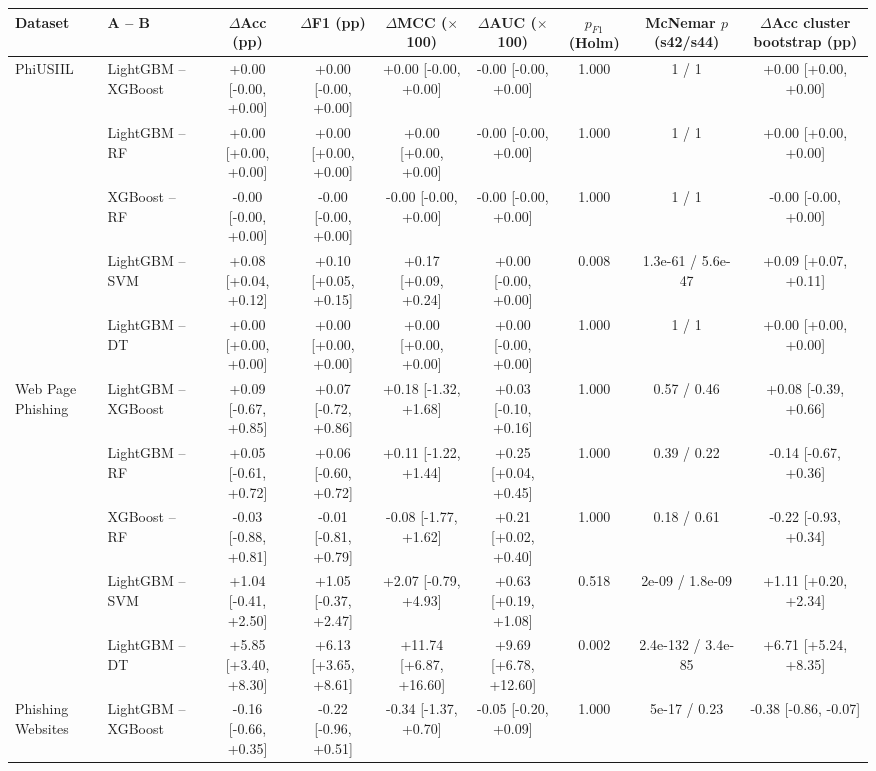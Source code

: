\begin{tabular}{@{}llccccccc@{}}
\toprule
\textbf{Dataset} & \textbf{A -- B} & \textbf{$\Delta$Acc (pp)} & \textbf{$\Delta$F1 (pp)} & \textbf{$\Delta$MCC ($\times$100)} & \textbf{$\Delta$AUC ($\times$100)} & \textbf{$p_{F1}$ (Holm)} & \textbf{McNemar $p$ (s42/s44)} & \textbf{$\Delta$Acc cluster bootstrap (pp)}\\
\midrule
PhiUSIIL & LightGBM -- XGBoost & +0.00 [-0.00, +0.00] & +0.00 [-0.00, +0.00] & +0.00 [-0.00, +0.00] & -0.00 [-0.00, +0.00] & 1.000 & 1 / 1 & +0.00 [+0.00, +0.00]\\
 & LightGBM -- RF & +0.00 [+0.00, +0.00] & +0.00 [+0.00, +0.00] & +0.00 [+0.00, +0.00] & -0.00 [-0.00, +0.00] & 1.000 & 1 / 1 & +0.00 [+0.00, +0.00]\\
 & XGBoost -- RF & -0.00 [-0.00, +0.00] & -0.00 [-0.00, +0.00] & -0.00 [-0.00, +0.00] & -0.00 [-0.00, +0.00] & 1.000 & 1 / 1 & -0.00 [-0.00, +0.00]\\
 & LightGBM -- SVM & +0.08 [+0.04, +0.12] & +0.10 [+0.05, +0.15] & +0.17 [+0.09, +0.24] & +0.00 [-0.00, +0.00] & 0.008 & 1.3e-61 / 5.6e-47 & +0.09 [+0.07, +0.11]\\
 & LightGBM -- DT & +0.00 [+0.00, +0.00] & +0.00 [+0.00, +0.00] & +0.00 [+0.00, +0.00] & +0.00 [-0.00, +0.00] & 1.000 & 1 / 1 & +0.00 [+0.00, +0.00]\\
\midrule
Web Page Phishing & LightGBM -- XGBoost & +0.09 [-0.67, +0.85] & +0.07 [-0.72, +0.86] & +0.18 [-1.32, +1.68] & +0.03 [-0.10, +0.16] & 1.000 & 0.57 / 0.46 & +0.08 [-0.39, +0.66]\\
 & LightGBM -- RF & +0.05 [-0.61, +0.72] & +0.06 [-0.60, +0.72] & +0.11 [-1.22, +1.44] & +0.25 [+0.04, +0.45] & 1.000 & 0.39 / 0.22 & -0.14 [-0.67, +0.36]\\
 & XGBoost -- RF & -0.03 [-0.88, +0.81] & -0.01 [-0.81, +0.79] & -0.08 [-1.77, +1.62] & +0.21 [+0.02, +0.40] & 1.000 & 0.18 / 0.61 & -0.22 [-0.93, +0.34]\\
 & LightGBM -- SVM & +1.04 [-0.41, +2.50] & +1.05 [-0.37, +2.47] & +2.07 [-0.79, +4.93] & +0.63 [+0.19, +1.08] & 0.518 & 2e-09 / 1.8e-09 & +1.11 [+0.20, +2.34]\\
 & LightGBM -- DT & +5.85 [+3.40, +8.30] & +6.13 [+3.65, +8.61] & +11.74 [+6.87, +16.60] & +9.69 [+6.78, +12.60] & 0.002 & 2.4e-132 / 3.4e-85 & +6.71 [+5.24, +8.35]\\
\midrule
Phishing Websites & LightGBM -- XGBoost & -0.16 [-0.66, +0.35] & -0.22 [-0.96, +0.51] & -0.34 [-1.37, +0.70] & -0.05 [-0.20, +0.09] & 1.000 & 5e-17 / 0.23 & -0.38 [-0.86, -0.07]\\

\end{tabular}
